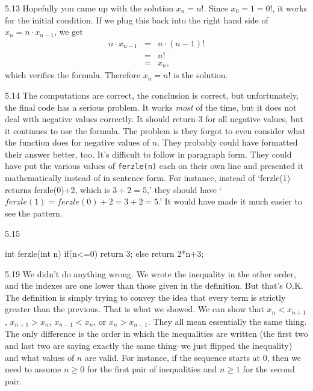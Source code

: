 \begin{Answer}{5.13}
Hopefully you came up with the solution $x_n=n!$.
Since $x_0=1=0!$, it works for the initial condition.
If we plug this back into the
right hand side of $x_n=n\cdot x_{n-1}$,  we get
\begin{eqnarray*}
n\cdot x_{n-1}&=&n\cdot (n-1)!\\
&=&n!\\
&=&x_n,
\end{eqnarray*}
which verifies the formula.  Therefore $x_n=n!$ is the solution.
\end{Answer}
\begin{Answer}{5.14}
The computations are correct, the conclusion is correct, but unfortunately,
the final code has a serious problem.  It works {\em most} of the time,
but it does not deal with negative values correctly.
It should return $3$ for all negative
values, but it continues to use the formula.
The problem is they forgot to even consider what the function does for negative values of $n$.
They probably could have formatted their answer better, too.  It's difficult to follow in paragraph
form.  They could have put the various values of \verb+ferzle(n)+ each on their own line
and presented it mathematically instead of in sentence form.
For instance, instead of `ferzle(1) returns ferzle(0)+2, which is $3+2=5$,'
they should have `$ferzle(1)=ferzle(0)+2=3+2=5$.'
It would have made it much easier to see the pattern.
\end{Answer}
\begin{Answer}{5.15}
\begin{code}
	int ferzle(int n) {
		if(n<=0) {
		    return 3;
	    } else {
		    return 2*n+3;
		}
	}
\end{code}
\end{Answer}
\begin{Answer}{5.19}
We didn't do anything wrong.  We wrote the inequality in the other order, and the indexes are one lower
than those given in the definition.  But that's O.K.  The definition is simply trying to convey the idea
that every term is strictly greater than the previous.  That is what we showed.
We can show that
$x_n<x_{n+1}$, $x_{n+1}>x_n$, $x_{n-1}<x_{n}$, or $x_n>x_{n-1}$.  They all mean essentially the same thing.
The only difference is the order in which the inequalities are written (the first two and last two are
saying exactly the same thing--we just flipped the inequality) and what values of $n$ are valid.
For instance, if the sequence starts at $0$, then we need to assume
$n\geq 0$ for the first pair of inequalities and  $n\geq 1$ for the second pair.
\end{Answer}
